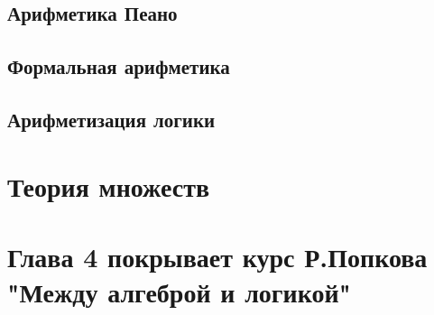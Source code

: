\documentclass[12pt,a4paper,oneside,openany]{book}
\theoremstyle{definition}
\theoremstyle{plain}
\theoremstyle{remark}
\begin{document}
\section{Арифметика Пеано}
\section{Формальная арифметика}
\section{Арифметизация логики}










\chapter{Теория множеств}






































































\chapter*{Глава 4 покрывает курс Р.Попкова "Между алгеброй и логикой"}
\end{document}

